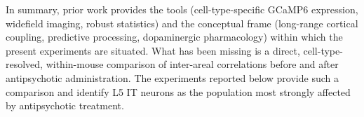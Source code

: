 In summary, prior work provides the tools (cell-type-specific GCaMP6 expression, widefield imaging, robust statistics) and the conceptual frame (long-range cortical coupling, predictive processing, dopaminergic pharmacology) within which the present experiments are situated. What has been missing is a direct, cell-type-resolved, within-mouse comparison of inter-areal correlations before and after antipsychotic administration. The experiments reported below provide such a comparison and identify L5 IT neurons as the population most strongly affected by antipsychotic treatment.
